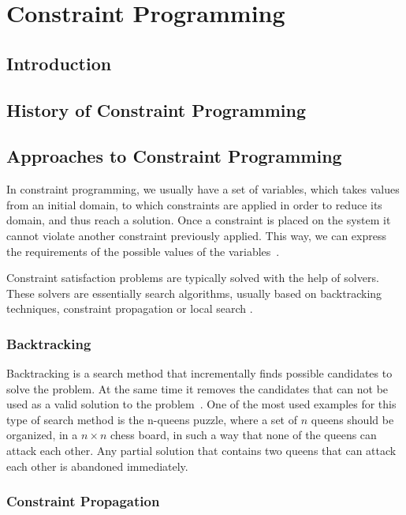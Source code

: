 \chapter{Constraint Programming}

\section{Introduction}

\section{History of Constraint Programming}

\section{Approaches to Constraint Programming}

In constraint programming, we usually have a set of variables, which takes values from an initial domain, to which constraints are applied in order to reduce its domain, and thus reach a solution. Once a constraint is placed on the system it cannot violate another constraint previously applied. This way, we can express the requirements of the possible values of the variables~\cite{Pearson1997}.

Constraint satisfaction problems are typically solved with the help of solvers. These solvers are essentially search algorithms, usually based on backtracking techniques\cite{Knuth1997}, constraint propagation \cite{Lecoutre2010} or local search \cite{Dechter2003}. 

\subsection{Backtracking}

Backtracking is a search method that incrementally finds possible candidates to solve the problem. At the same time it removes the candidates that can not be used as a valid solution to the problem~\cite{Knuth1997}. One of the most used examples for this type of search method is the n-queens puzzle, where a set of $n$ queens should be organized, in a $n \times n$ chess board, in such a way that none of the queens can attack each other. Any partial solution that contains two queens that can attack each other is abandoned immediately.

\subsection{Constraint Propagation}

